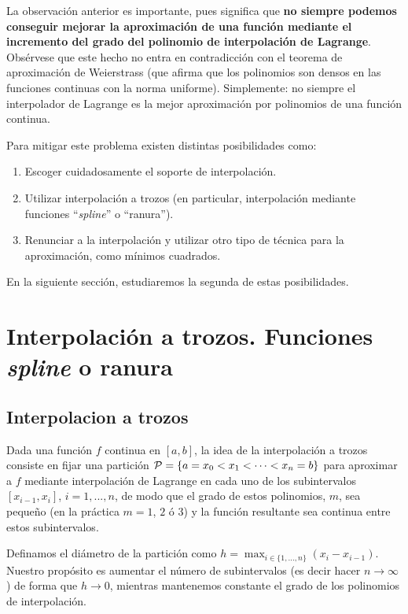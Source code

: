 La observación anterior es importante, pues significa que \textbf{no siempre
  podemos conseguir mejorar la aproximación de una función mediante el
  incremento del grado del polinomio de interpolación de Lagrange}.
Obsérvese que este hecho no entra en contradicción con el teorema de
aproximación de Weierstrass (que afirma que los polinomios son densos
en las funciones continuas con la norma uniforme). Simplemente: no
siempre el interpolador de Lagrange es la mejor aproximación por
polinomios de una función continua.

Para mitigar este problema existen distintas posibilidades como:
\begin{enumerate}
\item Escoger cuidadosamente el soporte de interpolación.
\item Utilizar interpolación a trozos (en particular, interpolación mediante funciones ``\textit{spline}'' o ``ranura'').
\item Renunciar a la interpolación y utilizar otro tipo de técnica
  para la aproximación, como mínimos cuadrados.
\end{enumerate}

En la siguiente sección, estudiaremos la segunda de estas
posibilidades.

\section{Interpolación a trozos. Funciones \textit{spline} o ranura}
\label{sec:interp-trozos-splines}

\subsection{Interpolacion a trozos}
\label{sec:interpolacion-trozos}


Dada una función $f$ continua en $[a,b]$, la idea de la interpolación
a trozos consiste en fijar una partición ${\cal
  P}=\{a=x_0<x_1<\cdots<x_n=b\}$ para aproximar a $f$ mediante
interpolación de Lagrange en cada uno de los subintervalos
$[x_{i-1},x_{i}]$, $i=1,...,n$, de modo que el grado de estos
polinomios, $m$, sea pequeño (en la práctica $m=1$, $2$ ó $3$) y la
función resultante sea continua entre estos subintervalos.

Definamos el diámetro de la partición como
$h=\max_{i\in\{1,...,n\}}(x_i-x_{i-1})$. Nuestro propósito es aumentar
el número de subintervalos (es decir hacer $n\to \infty$) de forma
que $h\to 0$, mientras mantenemos constante el grado de los polinomios
de interpolación.


